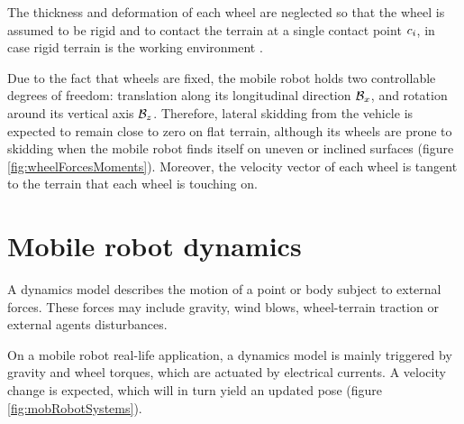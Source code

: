 \begin{assumption}
	The thickness and deformation of each wheel are neglected so that the wheel is assumed to be rigid and to contact the terrain at a single contact point $c_i$, in case rigid terrain is the working environment \cite{Iagnemma2004}.
	\label{assumption:singlePointContact}
\end{assumption}

Due to the fact that wheels are fixed, the mobile robot holds two controllable degrees of freedom: translation along its longitudinal direction $\mathcal{B}_x$, and rotation around its vertical axis $\mathcal{B}_z$. Therefore, lateral skidding from the vehicle is expected to remain close to zero on flat terrain, although its wheels are prone to skidding when the mobile robot finds itself on uneven or inclined surfaces (figure \ref{fig:wheelForcesMoments}). Moreover, the velocity vector of each wheel is tangent to the terrain that each wheel is touching on.

\section{Mobile robot dynamics}
\label{section:robotDynamics}

A dynamics model describes the motion of a point or body subject to external forces. These forces may include gravity, wind blows, wheel-terrain traction or external agents disturbances. 

On a mobile robot real-life application, a dynamics model is mainly triggered by gravity and wheel torques, which are actuated by electrical currents. A velocity change is expected, which will in turn yield an updated pose (figure \ref{fig:mobRobotSystems}).

